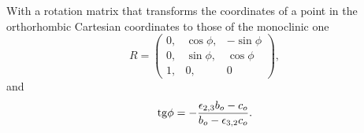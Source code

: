 \documentclass[12pt,a4paper]{article}
\begin{document}
With a rotation matrix that transforms the coordinates of a point
in the orthorhombic Cartesian coordinates to those of the monoclinic one
\begin{equation}
R=\left( \begin{array}{ccc}
0, & \cos \phi, &  -\sin \phi
\\
0, & \sin \phi, & \cos \phi 
\\
1, & 0, & 0
\end{array}
\right),
\end{equation}
and 
\begin{equation}
{\rm tg} \phi = -{\epsilon_{2,3} b_o - c_o \over b_o - \epsilon_{3,2} c_o}.
\end{equation}


%
%
\end{document}
